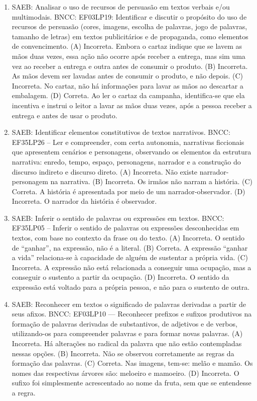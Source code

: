 \begin{enumerate}
\item
SAEB: Analisar o uso de recursos de persuasão em textos verbais e/ou multimodais.
BNCC: EF03LP19: Identificar e discutir o propósito do uso de recursos de persuasão (cores,
imagens, escolha de palavras, jogo de palavras, tamanho de letras) em textos publicitários
e de propaganda, como elementos de convencimento.
(A) Incorreta. Embora o cartaz indique que se lavem as mãos duas vezes,
essa ação não ocorre após receber a entrega, mas sim uma vez ao receber
a entrega e outra antes de consumir o produto.
(B) Incorreta. As mãos devem ser lavadas antes de consumir o produto, e
não depois.
(C) Incorreta. No cartaz, não há informações para lavar as mãos ao descartar a embalagem.
(D) Correta. Ao ler o cartaz da campanha, identifica-se que ela
incentiva e instrui o leitor a lavar as mãos duas vezes, após a pessoa
receber a entrega e antes de usar o produto.

\item
SAEB: Identificar elementos constitutivos de textos narrativos.
BNCC: EF35LP26 -- Ler e compreender, com certa autonomia, narrativas
ficcionais que apresentem cenários e personagens, observando os
elementos da estrutura narrativa: enredo, tempo, espaço, personagens,
narrador e a construção do discurso indireto e discurso direto.
(A) Incorreta. Não existe narrador-personagem na narrativa.
(B) Incorreta. Os irmãos não narram a história.
(C) Correta. A história é apresentada por meio de um narrador-observador.
(D) Incorreta. O narrador da história é observador.

\item
SAEB: Inferir o sentido de palavras ou expressões em textos.
BNCC: EF35LP05 -- Inferir o sentido de palavras ou expressões desconhecidas em textos, com base no
contexto da frase ou do texto.
(A) Incorreta. O sentido de ``ganhar'', na expressão, não é a literal.
(B) Correta. A expressão ``ganhar a vida'' relaciona-se à capacidade de alguém de sustentar a própria vida.
(C) Incorreta. A expressão não está relacionada a conseguir uma ocupação, mas a conseguir o sustento a partir da ocupação.
(D) Incorreta. O sentido da expressão está voltado para a própria pessoa, e não para o sustento de outra.

\item
SAEB: Reconhecer em textos o significado de palavras derivadas a partir de seus afixos.
BNCC: EF03LP10 --- Reconhecer prefixos e sufixos produtivos na formação de
palavras derivadas de substantivos, de adjetivos e de verbos,
utilizando-os para compreender palavras e para formar novas palavras.
(A) Incorreta. Há alterações no radical da palavra que não estão contempladas nessas opções.
(B) Incorreta. Não se observou corretamente as regras da formação das palavras.
(C) Correta. Nas imagens, tem-se: melão e mamão. Os nomes das respectivas árvores são: meloeiro e mamoeiro.
(D) Incorreta. O sufixo foi simplesmente acrescentado ao nome da fruta, sem que se entendesse a regra.


\end{enumerate}
